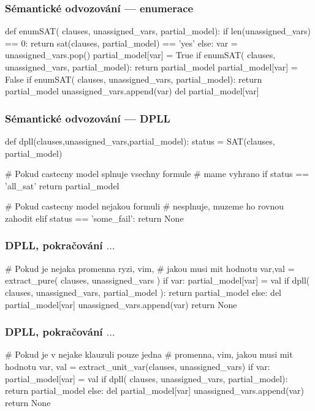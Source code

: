 \documentclass[red,professionalfont]{beamer}
\theoremstyle{definition}
\newcommand{\0}{\mbox{${\bf 0}$}}
\begin{document}
\begin{frame}[fragile]\frametitle{Sémantické odvozování --- enumerace}
\begin{python}
def enumSAT( clauses, unassigned_vars, partial_model):
    if len(unassigned_vars) == 0:
        return sat(clauses, partial_model) == 'yes'
    else:
        var = unassigned_vars.pop()
        partial_model[var] = True
        if enumSAT( clauses, unassigned_vars, partial_model): return partial_model
        partial_model[var] = False
        if enumSAT( clauses, unassigned_vars, partial_model): return partial_model
        unassigned_vars.append(var)
        del partial_model[var]
\end{python}
\end{frame}

\begin{frame}[fragile]\frametitle{Sémantické odvozování --- DPLL}
\begin{python}
def dpll(clauses,unassigned_vars,partial_model):
  status = SAT(clauses, partial_model)
  
  # Pokud castecny model splnuje vsechny formule
  # mame vyhrano
  if status == 'all_sat'
    return partial_model
  
  # Pokud castecny model nejakou formuli 
  # nesplnuje, muzeme ho rovnou zahodit
  elif status == 'some_fail':
    return None
\end{python}
\end{frame}
\begin{frame}[fragile]\frametitle{DPLL, pokračování $\ldots$}
\begin{python}    
  # Pokud je nejaka promenna ryzi, vim, 
  # jakou musi mit hodnotu
  var,val = extract_pure( clauses, unassigned_vars )
  if var:
      partial_model[var] = val
      if dpll( clauses, unassigned_vars, partial_model ): return partial_model
      else:
          del partial_model[var]
          unassigned_vars.append(var)
          return None
\end{python}
\end{frame}
\begin{frame}[fragile]\frametitle{DPLL, pokračování $\ldots$}
\begin{python}  
  # Pokud je v nejake klauzuli pouze jedna
  # promenna, vim, jakou musi mit hodnotu
  var, val = extract_unit_var(clauses, unassigned_vars)
  if var:
      partial_model[var] = val
      if dpll( clauses, unassigned_vars, partial_model): return partial_model
      else:
          del partial_model[var]
          unassigned_vars.append(var)
          return None
\end{python}
\end{frame}
\end{document}
